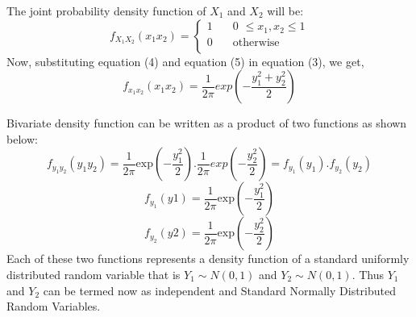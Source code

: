 \noindent The joint probability density function of $X_1$ and $X_2$ will be:\\
\[ f_{X_1X_2}(x_1x_2) =
	\begin{cases}
	\text{1}   &\quad\text{0 $\leq x_1, x_2 \leq $1}\\
	\text{0} &\quad\text{otherwise}\\
	\end{cases} \tag{5}
\]
\noindent Now, substituting equation (4) and equation (5) in equation (3), we get,
$$f_{x_1x_2}(x_1x_2) = \frac{1}{2\pi}exp(-\frac{y_1^2+y_2^2}{2})$$

\noindent Bivariate density function can be written as a product of two functions as shown below:\\
$$f_{y_1y_2}(y_1y_2) = \frac{1}{2\pi}\text{exp}(-\frac{y_1^2}{2}).\frac{1}{2\pi}exp(-\frac{y_2^2}{2})=f_{y_1}(y_1).f_{y_2}(y_2)$$
$$f_{y_1}(y1)=\frac{1}{2 \pi}\text{exp}(-\frac{y_1^2}{2})$$
$$f_{y_2}(y2)=\frac{1}{2 \pi}\text{exp}(-\frac{y_2^2}{2})$$
\noindent Each of these two functions represents a density function of a standard uniformly distributed random variable that is $Y_1 \sim N(0,1)$ and $Y_2 \sim N(0,1)$. Thus $Y_1$ and $Y_2$ can be termed now as independent and Standard Normally Distributed Random Variables.


